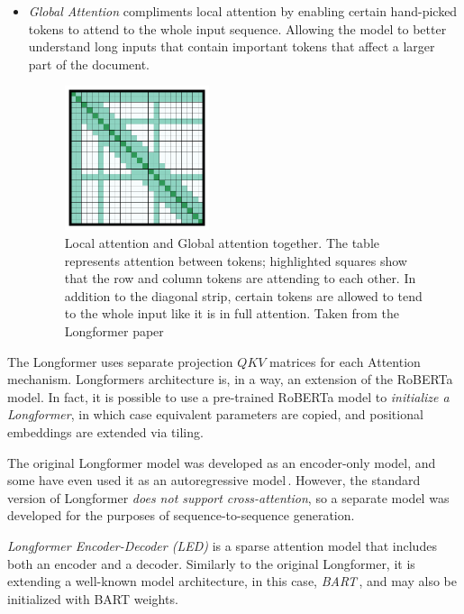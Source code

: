 \begin{itemize}
            \item \emph{Global Attention} compliments local attention by enabling certain hand-picked tokens to attend to the whole input sequence. Allowing the model to better understand long inputs that contain important tokens that affect a larger part of the document. 
            \begin{figure}[H]
              \centering
              \includegraphics[width=0.4\textwidth]{obrazky-figures/fig-attn-combined.pdf}
              \caption{Local attention and Global attention together. The table represents attention between tokens; highlighted squares show that the row and column tokens are attending to each other. In addition to the diagonal strip, certain tokens are allowed to tend to the whole input like it is in full attention. Taken from the Longformer paper\,\cite{beltagy2020longformer}}
              \label{fig:global-attention}
            \end{figure}
        \end{itemize}

        The Longformer uses separate projection $QKV$ matrices for each Attention mechanism. Longformers architecture is, in a way, an extension of the RoBERTa\,\cite{liu2019roberta} model. In fact, it is possible to use a pre-trained RoBERTa model to \emph{initialize a Longformer}, in which case equivalent parameters are copied, and positional embeddings are extended via tiling. 
        
        The original Longformer model was developed as an encoder-only model, and some have even used it as an autoregressive model\,\cite{guo2023longcoder}. However, the standard version of Longformer \emph{does not support cross-attention}, so a separate model was developed for the purposes of sequence-to-sequence generation.

        \emph{Longformer Encoder-Decoder (LED)} is a sparse attention model that includes both an encoder and a decoder. Similarly to the original Longformer, it is extending a well-known model architecture, in this case, \emph{BART}\,\cite{bart-2020}, and may also be initialized with BART weights.

